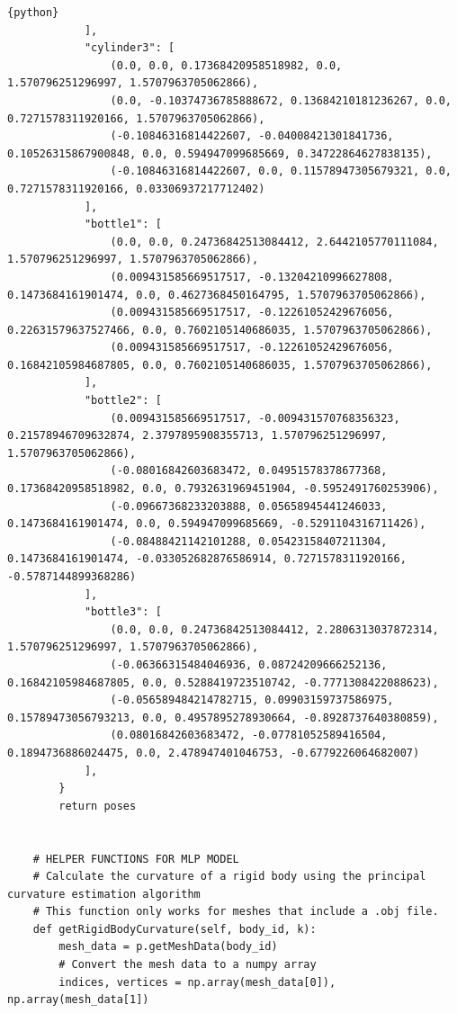 \documentclass[11pt, a4paper]{report}
\begin{document}
\begin{lstlisting}{python}
            ],
            "cylinder3": [
                (0.0, 0.0, 0.17368420958518982, 0.0, 1.570796251296997, 1.5707963705062866),
                (0.0, -0.10374736785888672, 0.13684210181236267, 0.0, 0.7271578311920166, 1.5707963705062866),
                (-0.10846316814422607, -0.04008421301841736, 0.10526315867900848, 0.0, 0.594947099685669, 0.34722864627838135),
                (-0.10846316814422607, 0.0, 0.11578947305679321, 0.0, 0.7271578311920166, 0.03306937217712402)
            ],
            "bottle1": [
                (0.0, 0.0, 0.24736842513084412, 2.6442105770111084, 1.570796251296997, 1.5707963705062866),
                (0.009431585669517517, -0.13204210996627808, 0.1473684161901474, 0.0, 0.4627368450164795, 1.5707963705062866),
                (0.009431585669517517, -0.12261052429676056, 0.22631579637527466, 0.0, 0.7602105140686035, 1.5707963705062866),
                (0.009431585669517517, -0.12261052429676056, 0.16842105984687805, 0.0, 0.7602105140686035, 1.5707963705062866),
            ],
            "bottle2": [
                (0.009431585669517517, -0.009431570768356323, 0.21578946709632874, 2.3797895908355713, 1.570796251296997, 1.5707963705062866),
                (-0.08016842603683472, 0.04951578378677368, 0.17368420958518982, 0.0, 0.7932631969451904, -0.5952491760253906),
                (-0.09667368233203888, 0.05658945441246033, 0.1473684161901474, 0.0, 0.594947099685669, -0.5291104316711426),
                (-0.08488421142101288, 0.05423158407211304, 0.1473684161901474, -0.033052682876586914, 0.7271578311920166, -0.5787144899368286)
            ],
            "bottle3": [
                (0.0, 0.0, 0.24736842513084412, 2.2806313037872314, 1.570796251296997, 1.5707963705062866),
                (-0.06366315484046936, 0.08724209666252136, 0.16842105984687805, 0.0, 0.5288419723510742, -0.7771308422088623),
                (-0.056589484214782715, 0.09903159737586975, 0.15789473056793213, 0.0, 0.4957895278930664, -0.8928737640380859),
                (0.08016842603683472, -0.07781052589416504, 0.1894736886024475, 0.0, 2.478947401046753, -0.6779226064682007)
            ],
        }
        return poses


    # HELPER FUNCTIONS FOR MLP MODEL
    # Calculate the curvature of a rigid body using the principal curvature estimation algorithm
    # This function only works for meshes that include a .obj file.
    def getRigidBodyCurvature(self, body_id, k):
        mesh_data = p.getMeshData(body_id)
        # Convert the mesh data to a numpy array
        indices, vertices = np.array(mesh_data[0]), np.array(mesh_data[1])


\end{lstlisting}
\end{document}

